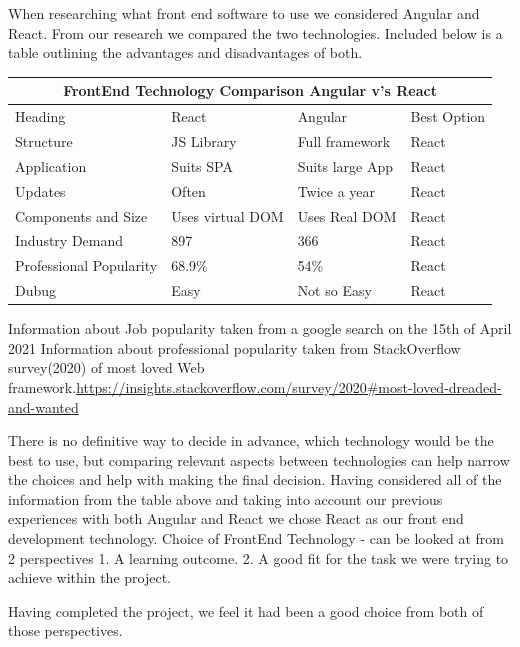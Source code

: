 When researching what front end software to use we considered Angular and React. From our research we compared the two technologies. Included below is a table outlining the advantages and disadvantages of both.
\begin{table}[h!]
\centering
\begin{tabular}{ |p{3cm}||p{3cm}|p{3cm}|p{3cm}| }
 \hline
 \multicolumn{4}{|c|}{FrontEnd Technology Comparison Angular v's React} \\

 \hline
 Heading& React& Angular&Best Option\\
 \hline
 Structure   & JS Library    &Full framework &  React\\
 Application & Suits SPA    & Suits large App   &React\\
 Updates &Often & Twice a year&  React\\
 Components and Size    &Uses virtual DOM & Uses Real DOM&  React\\
 Industry Demand&   897  & 366& React\\
 Professional Popularity& 68.9\% &54\%   &React\\
 Dubug& Easy& Not so Easy& React\\
 
 \hline
\end{tabular}
\end{table}

\hfill \break


Information about Job popularity taken from a google search on the 15th of April 2021
Information about professional popularity taken from StackOverflow survey(2020) of most loved Web framework.\url{https://insights.stackoverflow.com/survey/2020#most-loved-dreaded-and-wanted}


There is no definitive way to decide in advance, which technology would be the best to use, but comparing relevant aspects between technologies can help narrow the choices and help with making the final decision. Having considered all of the information from the table above and taking into account our previous experiences with both Angular and React we chose React as our front end development technology.
Choice of FrontEnd Technology - can be looked at from 2 perspectives 1. A learning outcome.
2. A good fit for the task we were trying to achieve within the project.

Having completed the project, we feel it had been a good choice from both of those perspectives. 

